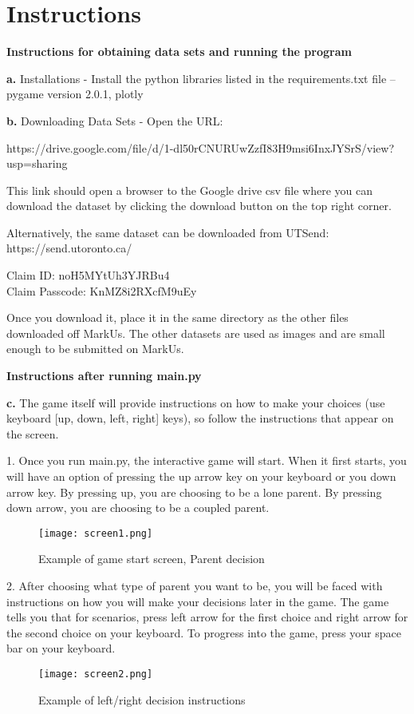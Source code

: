 \documentclass[fontsize=11pt]{article}
\begin{document}
    \section*{Instructions}
    \textbf{Instructions for obtaining data sets and running the program}

    \textbf{a.} Installations - Install the python libraries listed in the requirements.txt file – pygame version 2.0.1, plotly

    \textbf{b.} Downloading Data Sets - Open the URL:

    https://drive.google.com/file/d/1-dl50rCNURUwZzfI83H9msi6InxJYSrS/view?usp=sharing

    This link should open a browser to the Google drive csv file where you can download the dataset by clicking the download button on the top right corner.

    Alternatively, the same dataset can be downloaded from UTSend: https://send.utoronto.ca/

    Claim ID: noH5MYtUh3YJRBu4 \\
    Claim Passcode: KnMZ8i2RXcfM9uEy

    Once you download it, place it in the same directory as the other files downloaded off MarkUs. The other datasets are used as images and are small enough to be submitted on MarkUs.

    \textbf{Instructions after running main.py}

    \textbf{c.} The game itself will provide instructions on how to make
    your choices (use keyboard [up, down, left, right] keys), so follow the instructions that appear on the screen.

    1. Once you run main.py, the interactive game will start. When it first starts, you will have an option of pressing the up arrow key on your keyboard or you down arrow key. By pressing up, you are choosing to be a lone parent. By pressing down arrow, you are choosing to be a coupled parent.

    \begin{figure}[htp]
        \centering
        \texttt{[image: screen1.png]}
        \caption{Example of game start screen, Parent decision}
        \label{fig:galaxy}
    \end{figure}

    2. After choosing what type of parent you want to be, you will be faced with instructions on how you will make your decisions later in the game. The game tells you that for scenarios, press left arrow for the first choice and right arrow for the second choice on your keyboard. To progress into the game, press your space bar on your keyboard.
    \begin{figure}[htp]
        \centering
        \texttt{[image: screen2.png]}
        \caption{Example of left/right decision instructions}
        \label{fig:galaxy}
    \end{figure}
    \\ \\ \\
\end{document}

